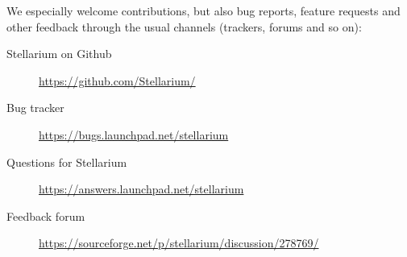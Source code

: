 We especially welcome contributions, but also bug reports, feature requests and other feedback through the
usual channels (trackers, forums and so on):
\begin{description}
\item[Stellarium on Github] \url{https://github.com/Stellarium/}
\item[Bug tracker] \url{https://bugs.launchpad.net/stellarium}
\item[Questions for Stellarium] \url{https://answers.launchpad.net/stellarium}
\item[Feedback forum] \url{https://sourceforge.net/p/stellarium/discussion/278769/}
\end{description}



